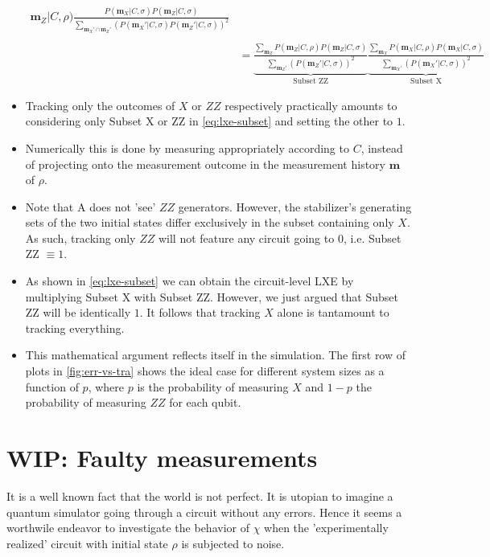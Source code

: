 \begin{itemize}
\begin{align}
        \mathbf{m}_Z | C, \rho) \frac{P(\mathbf{m}_X | C, \sigma) P( \mathbf{m}_Z|
        C, \sigma)}{\sum_{\mathbf{m}_X' \cap \mathbf{m}_Z'}
          \left(P(\mathbf{m}_X' | C,
        \sigma) P( \mathbf{m}_Z'|C,\sigma)\right)^2}\nonumber\\
        \nonumber\\
      &= \underbrace{\frac{\sum_{\mathbf{m}_Z} P(\mathbf{m}_Z | C, \rho)
          P(\mathbf{m}_Z | C, \sigma)}{\sum_{\mathbf{m}_Z'}
          \left(P(\mathbf{m}_Z' |
          C, \sigma)\right)^2}}_{\text{Subset ZZ}}
          \underbrace{\frac{\sum_{\mathbf{m}_X} P(\mathbf{m}_X | C, \rho)
          P(\mathbf{m}_X | C, \sigma)}{\sum_{\mathbf{m}_X'}
          \left(P(\mathbf{m}_X' |
          C, \sigma)\right)^2}}_{\text{Subset X}}
    \end{align}
  \item Tracking only the outcomes of $X$ or $ZZ$ respectively practically
    amounts to considering only Subset X or ZZ in \cref{eq:lxe-subset} and
    setting the other to $1$.
  \item Numerically this is done by measuring appropriately according to $C$,
    instead of projecting onto the measurement outcome in the measurement
    history $\mathbf{m}$ of $\rho$.
  \item Note that \textsf{A} does not 'see' $ZZ$ generators. However, the
    stabilizer's generating sets of the two initial states differ exclusively in the subset
    containing only $X$. As such, tracking only $ZZ$ will not feature any
    circuit going to $0$, i.e. Subset ZZ $\equiv 1$.
  \item As shown in \cref{eq:lxe-subset} we can obtain the circuit-level LXE by
    multiplying Subset X with Subset ZZ. However, we just argued that Subset ZZ
    will be identically $1$. It follows that tracking $X$ alone is tantamount
    to tracking everything.
  \item This mathematical argument reflects itself in the simulation. The first
    row of plots in \cref{fig:err-vs-tra} shows the ideal case for different
    system sizes as a function of $p$, where $p$ is the probability of
    measuring $X$ and $1-p$ the probability of measuring $ZZ$ for each qubit.
\end{itemize}
    
\section{WIP: Faulty measurements}
It is a well known fact that the world is not perfect. It is utopian to imagine
a quantum simulator going through a circuit without any errors. Hence it seems
a worthwile endeavor to investigate the behavior of $\chi$ when the
'experimentally realized' circuit with initial state $\rho$ is subjected to
noise.

